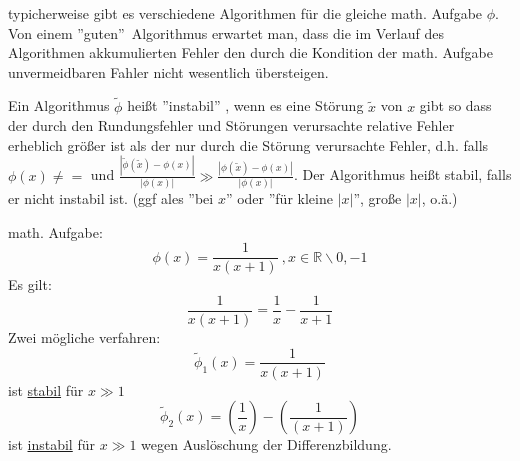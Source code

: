 \begin{remark} typicherweise gibt es verschiedene Algorithmen für die gleiche math. Aufgabe $\phi$. Von einem ''guten''\ Algorithmus erwartet man, dass die im Verlauf des Algorithmen akkumulierten Fehler den durch die Kondition der math. Aufgabe unvermeidbaren Fahler nicht wesentlich übersteigen.
\end{remark}
\begin{definition}
     Ein Algorithmus $\tilde{\phi}$ heißt ''instabil'' , wenn es eine Störung $\tilde{x}$ von $x$ gibt so dass der durch den Rundungsfehler und Störungen verursachte relative Fehler erheblich größer ist als der nur durch die Störung verursachte Fehler, d.h. falls $\phi(x) \neq = $ und $\displaystyle\frac{|\tilde{\phi}(\tilde{x})-\phi(x)|}{|\phi(x)|}\gg \displaystyle\frac{|\phi(\tilde{x})-\phi(x)|}{|\phi(x)|} $.
    Der Algorithmus heißt stabil, falls er nicht instabil ist. (ggf ales ''bei $x$'' oder ''für kleine $|x|$'', große $|x|$, o.ä.)
\end{definition}
\begin{example}
    math. Aufgabe: $$\phi(x)=\frac{1}{x(x+1)} \ , x \in \mathbb{R}\backslash {0,-1}$$
    Es gilt: $$\frac{1}{x(x+1)}=\frac{1}{x}-\frac{1}{x+1}$$
    Zwei mögliche verfahren:$$\tilde{\phi}_1(x)=\frac{1}{x(x+1)}$$ ist \underline{stabil} für $x\gg 1$
    $$\tilde{\phi}_2 (x)= \left(\frac{1}{x}\right)-\left(\frac{1}{(x+1)}\right)$$ ist 
    \underline{instabil} für $x \gg 1$ wegen Auslöschung der Differenzbildung.
\end{example}

